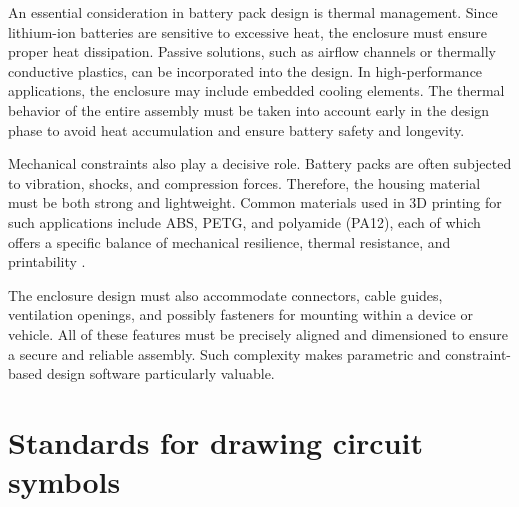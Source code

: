 An essential consideration in battery pack design is thermal management. Since lithium-ion batteries are sensitive to excessive heat, the enclosure must ensure proper heat dissipation. Passive solutions, such as airflow channels or thermally conductive plastics, can be incorporated into the design. In high-performance applications, the enclosure may include embedded cooling elements. The thermal behavior of the entire assembly must be taken into account early in the design phase to avoid heat accumulation and ensure battery safety and longevity.

Mechanical constraints also play a decisive role. Battery packs are often subjected to vibration, shocks, and compression forces. Therefore, the housing material must be both strong and lightweight. Common materials used in 3D printing for such applications include ABS, PETG, and polyamide (PA12), each of which offers a specific balance of mechanical resilience, thermal resistance, and printability \cite{gebhardt2016}.

The enclosure design must also accommodate connectors, cable guides, ventilation openings, and possibly fasteners for mounting within a device or vehicle. All of these features must be precisely aligned and dimensioned to ensure a secure and reliable assembly. Such complexity makes parametric and constraint-based design software particularly valuable.

\section{Standards for drawing circuit symbols}

